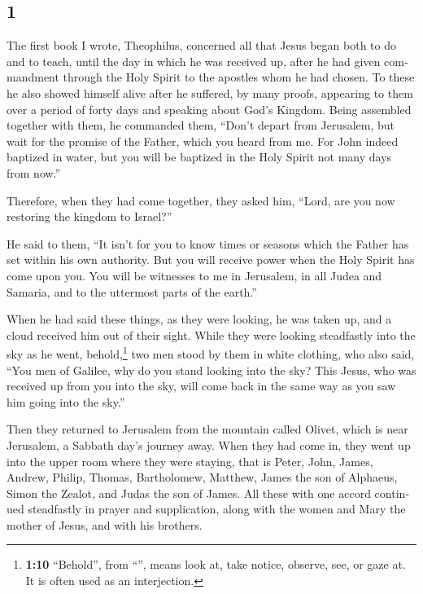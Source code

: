 \begin{paracol}{2}
\switchcolumn
\begin{otherlanguage}{english}

\hypertarget{section-1}{%
\section{1}\label{section-1}}

 The first book I wrote, Theophilus, concerned all that
Jesus began both to do and to teach,  until the day in
which he was received up, after he had given commandment through the
Holy Spirit to the apostles whom he had chosen.  To these
he also showed himself alive after he suffered, by many proofs,
appearing to them over a period of forty days and speaking about God's
Kingdom.  Being assembled together with them, he commanded
them, ``Don't depart from Jerusalem, but wait for the promise of the
Father, which you heard from me.  For John indeed baptized
in water, but you will be baptized in the Holy Spirit not many days from
now.''

 Therefore, when they had come together, they asked him,
``Lord, are you now restoring the kingdom to Israel?''

 He said to them, ``It isn't for you to know times or
seasons which the Father has set within his own authority.
 But you will receive power when the Holy Spirit has come
upon you. You will be witnesses to me in Jerusalem, in all Judea and
Samaria, and to the uttermost parts of the earth.''

 When he had said these things, as they were looking, he
was taken up, and a cloud received him out of their sight.
 While they were looking steadfastly into the sky as he
went, behold,\footnote{\textbf{1:10} ``Behold'', from ``'',
  means look at, take notice, observe, see, or gaze at. It is often used
  as an interjection.} two men stood by them in white clothing,
 who also said, ``You men of Galilee, why do you stand
looking into the sky? This Jesus, who was received up from you into the
sky, will come back in the same way as you saw him going into the sky.''

 Then they returned to Jerusalem from the mountain called
Olivet, which is near Jerusalem, a Sabbath day's journey away.
 When they had come in, they went up into the upper room
where they were staying, that is Peter, John, James, Andrew, Philip,
Thomas, Bartholomew, Matthew, James the son of Alphaeus, Simon the
Zealot, and Judas the son of James.  All these with one
accord continued steadfastly in prayer and supplication, along with the
women and Mary the mother of Jesus, and with his brothers.


\end{otherlanguage}
\end{paracol}
